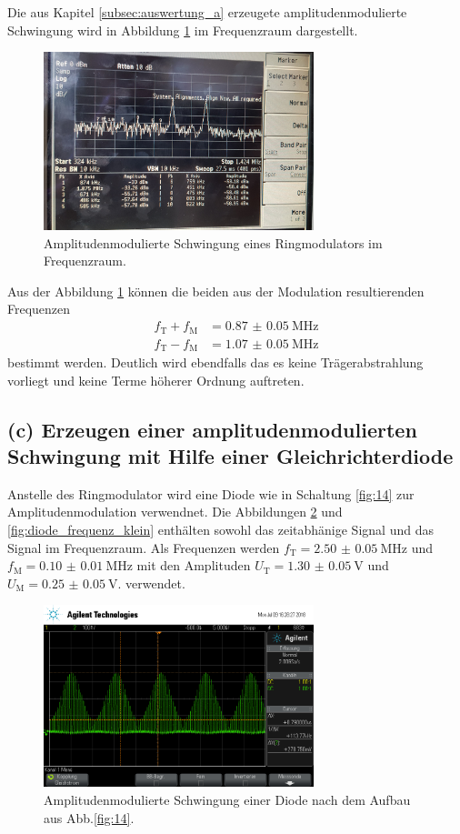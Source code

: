 Die aus Kapitel \ref{subsec:auswertung_a} erzeugete
amplitudenmodulierte Schwingung wird in Abbildung \ref{fig:ringamp_frequenz}
im Frequenzraum dargestellt.
\begin{figure}
  \centering
  \includegraphics[width=0.7\textwidth]{spec/frequenzbereich_klein_ring.jpg}
  \caption{Amplitudenmodulierte
  Schwingung eines Ringmodulators im Frequenzraum.}
  \label{fig:ringamp_frequenz}
\end{figure}
Aus der Abbildung \ref{fig:ringamp_frequenz}
können die beiden aus der Modulation resultierenden Frequenzen
\begin{align}
  f_{\text{T}}+f_{\text{M}}&=\SI{0.87(5)}{\mega\hertz} \\
  f_{\text{T}}-f_{\text{M}}&=\SI{1.07(5)}{\mega\hertz}
\end{align}
bestimmt werden.
Deutlich wird ebendfalls das es keine Trägerabstrahlung vorliegt und
keine Terme höherer Ordnung auftreten.

\FloatBarrier
\subsection{(c) Erzeugen einer amplitudenmodulierten Schwingung
mit Hilfe einer Gleichrichterdiode}
\label{subsec:auswertung_c}
Anstelle des Ringmodulator wird eine Diode wie in Schaltung \ref{fig:14} zur Amplitudenmodulation verwendnet.
Die Abbildungen \ref{fig:diode_zeit} und \ref{fig:diode_frequenz_klein}
enthälten
sowohl das zeitabhänige Signal und das Signal im Frequenzraum.
Als Frequenzen werden $f_{\text{T}}=\SI{2.50(5)}{\mega\hertz}$ und
$f_{\text{M}}=\SI{0.10(1)}{\mega\hertz}$ mit den Amplituden
$U_{\text{T}}=\SI{1.30(5)}{\volt}$ und
$U_{\text{M}}=\SI{0.25(5)}{\volt}$.
verwendet.

\begin{figure}
  \centering
  \includegraphics[width=0.7\textwidth]{osci/amp_mod_diode.png}
  \caption{Amplitudenmodulierte
  Schwingung einer Diode nach dem Aufbau aus Abb.\ref{fig:14}.}
  \label{fig:diode_zeit}
\end{figure}

